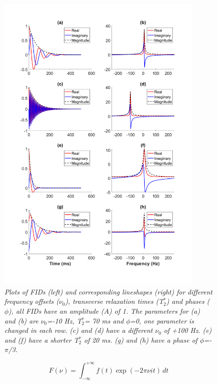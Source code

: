 \begin{figure}
    \centering
    \includegraphics[width=0.9\textwidth]{Figures/Theory/FID_Lorentz.png}
    \caption{\textit{Plots of \ac{FID}s (left) and corresponding lineshapes (right) for different frequency offsets ($\nu_0$), transverse relaxation times (T$_2^*$) and phases ($\phi$), all FIDs have an amplitude ($A$) of 1. The parameters for (a) and (b) are $\nu_0$=-10 Hz, T$_2^*$= 70 ms and $\phi$=0, one parameter is changed in each row. (c) and (d) have a different $\nu_0$ of +100 Hz. (e) and (f) have a shorter T$_2^*$ of 20 ms. (g) and (h) have a phase of $\phi$=-$\pi$/3.}}
    \label{fig:theory:FID_Lorentz}
\end{figure}

\begin{equation}
    F(\nu) = \int_{-\infty}^{+\infty} f(t)\exp(-2 \pi \nu i t) \, dt
    \label{eqn:theory:fourier}
\end{equation}


